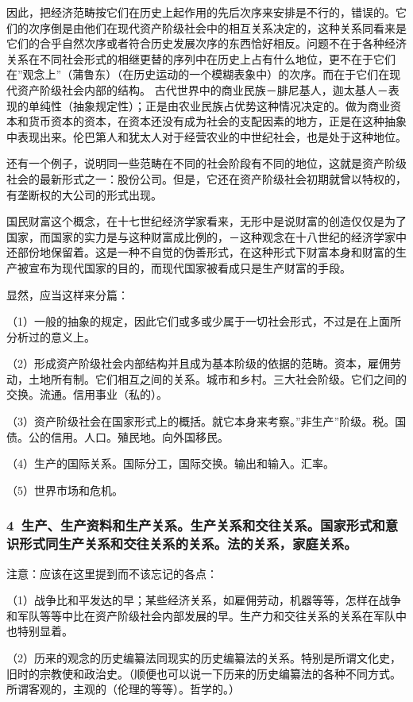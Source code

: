 \documentclass[a4paper,twoside,12pt,AutoFakeBold]{ctexart}
\begin{document}
因此，把经济范畴按它们在历史上起作用的先后次序来安排是不行的，错误的。它们的次序倒是由他们在现代资产阶级社会中的相互关系决定的，这种关系同看来是它们的合乎自然次序或者符合历史发展次序的东西恰好相反。问题不在于各种经济关系在不同社会形式的相继更替的序列中在历史上占有什么地位，更不在于它们在”观念上”（蒲鲁东）（在历史运动的一个模糊表象中）的次序。而在于它们在现代资产阶级社会内部的结构。
古代世界中的商业民族－腓尼基人，迦太基人－表现的单纯性（抽象规定性）；正是由农业民族占优势这种情况决定的。做为商业资本和货币资本的资本，在资本还没有成为社会的支配因素的地方，正是在这种抽象中表现出来。伦巴第人和犹太人对于经营农业的中世纪社会，也是处于这种地位。

还有一个例子，说明同一些范畴在不同的社会阶段有不同的地位，这就是资产阶级社会的最新形式之一：股份公司。但是，它还在资产阶级社会初期就曾以特权的，有垄断权的大公司的形式出现。

国民财富这个概念，在十七世纪经济学家看来，无形中是说财富的创造仅仅是为了国家，而国家的实力是与这种财富成比例的，－这种观念在十八世纪的经济学家中还部份地保留着。这是一种不自觉的伪善形式，在这种形式下财富本身和财富的生产被宣布为现代国家的目的，而现代国家被看成只是生产财富的手段。

显然，应当这样来分篇：

（1）一般的抽象的规定，因此它们或多或少属于一切社会形式，不过是在上面所分析过的意义上。

（2）形成资产阶级社会内部结构并且成为基本阶级的依据的范畴。资本，雇佣劳动，土地所有制。它们相互之间的关系。城市和乡村。三大社会阶级。它们之间的交换。流通。信用事业（私的）。

（3）资产阶级社会在国家形式上的概括。就它本身来考察。”非生产”阶级。税。国债。公的信用。人口。殖民地。向外国移民。

（4）生产的国际关系。国际分工，国际交换。输出和输入。汇率。

（5）世界市场和危机。

\subsubsection{4~生产、生产资料和生产关系。生产关系和交往关系。国家形式和意识形式同生产关系和交往关系的关系。法的关系，家庭关系。}

注意：应该在这里提到而不该忘记的各点：

（1）战争比和平发达的早；某些经济关系，如雇佣劳动，机器等等，怎样在战争和军队等等中比在资产阶级社会内部发展的早。生产力和交往关系的关系在军队中也特别显着。

（2）历来的观念的历史编纂法同现实的历史编纂法的关系。特别是所谓文化史，旧时的宗教使和政治史。（顺便也可以说一下历来的历史编纂法的各种不同方式。所谓客观的，主观的（伦理的等等）。哲学的。）
\end{document}
